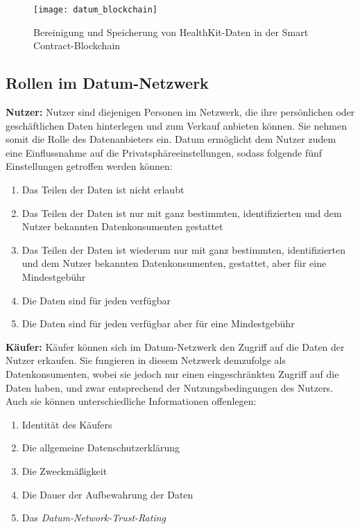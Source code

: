 \begin{figure}[!ht]
	\centering
	\texttt{[image: datum\_blockchain]}
	\caption{Bereinigung und Speicherung von HealthKit-Daten in der Smart Contract-Blockchain \cite{datum_2017}}
	\label{fig:datumBlockchain}
\end{figure}

\subsection{Rollen im Datum-Netzwerk}
\textbf{Nutzer:} Nutzer sind diejenigen Personen im Netzwerk, die ihre persönlichen oder geschäftlichen Daten hinterlegen und zum Verkauf anbieten können. Sie nehmen somit die Rolle des Datenanbieters ein. Datum ermöglicht dem Nutzer zudem eine Einflussnahme auf die Privatsphäreeinstellungen, sodass folgende fünf Einstellungen getroffen werden können: 
\begin{enumerate}
	\item Das Teilen der Daten ist nicht erlaubt
	\item Das Teilen der Daten ist nur mit ganz bestimmten, identifizierten und dem Nutzer bekannten Datenkonsumenten gestattet
	\item Das Teilen der Daten ist wiederum nur mit ganz bestimmten, identifizierten und dem Nutzer bekannten Datenkonsumenten, gestattet, aber für eine Mindestgebühr
	\item Die Daten sind für jeden verfügbar
	\item Die Daten sind für jeden verfügbar aber für eine Mindestgebühr
\end{enumerate}

\noindent \textbf{Käufer:} Käufer können sich im Datum-Netzwerk den Zugriff auf die Daten der Nutzer erkaufen. Sie fungieren in diesem Netzwerk demzufolge als Datenkonsumenten, wobei sie jedoch nur einen eingeschränkten Zugriff auf die Daten haben, und zwar entsprechend der Nutzungsbedingungen des Nutzers. Auch sie können unterschiedliche Informationen offenlegen:
\begin{enumerate}
	\item Identität des Käufers
	\item Die allgemeine Datenschutzerklärung
	\item Die Zweckmäßigkeit
	\item Die Dauer der Aufbewahrung der Daten
	\item Das \textit{Datum-Network-Trust-Rating}
\end{enumerate}

